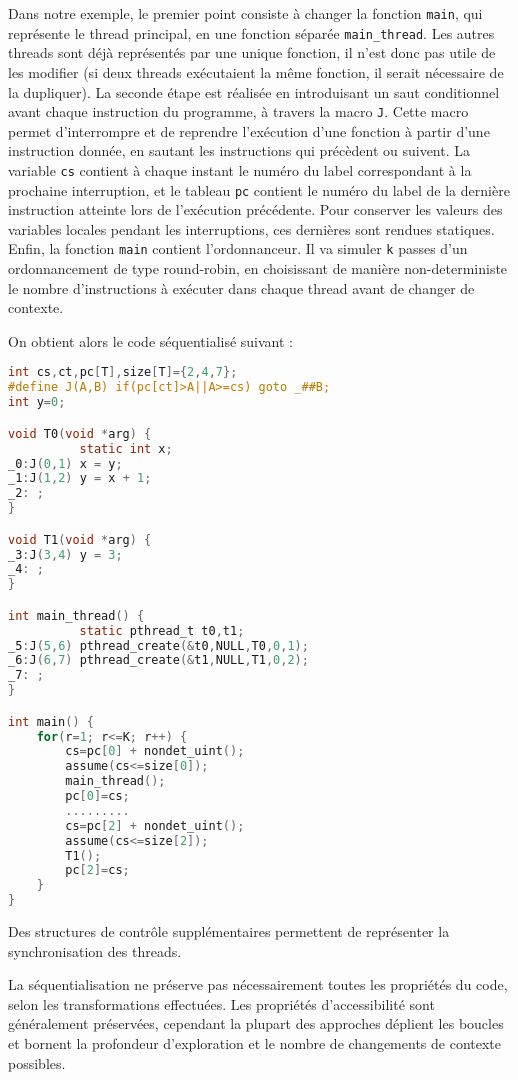 Dans notre exemple, le premier point consiste à changer la fonction
\lstinline!main!, qui représente le thread principal, en une fonction
séparée \lstinline!main_thread!. Les autres threads sont déjà
représentés par une unique fonction, il n'est donc pas utile de les
modifier (si deux threads exécutaient la même fonction, il serait
nécessaire de la dupliquer). La seconde étape est réalisée en
introduisant un saut conditionnel avant chaque instruction du programme,
à travers la macro \lstinline!J!. Cette macro permet d'interrompre et de
reprendre l'exécution d'une fonction à partir d'une instruction donnée,
en sautant les instructions qui précèdent ou suivent. La variable
\lstinline!cs! contient à chaque instant le numéro du label
correspondant à la prochaine interruption, et le tableau \lstinline!pc!
contient le numéro du label de la dernière instruction atteinte lors de
l'exécution précédente. Pour conserver les valeurs des variables locales
pendant les interruptions, ces dernières sont rendues statiques. Enfin,
la fonction \lstinline!main! contient l'ordonnanceur. Il va simuler
\lstinline!k! passes d'un ordonnancement de type round-robin, en
choisissant de manière non-deterministe le nombre d'instructions à
exécuter dans chaque thread avant de changer de contexte.

On obtient alors le code séquentialisé suivant :

\begin{lstlisting}[language=C]
int cs,ct,pc[T],size[T]={2,4,7};
#define J(A,B) if(pc[ct]>A||A>=cs) goto _##B;
int y=0;

void T0(void *arg) {
          static int x;
_0:J(0,1) x = y;
_1:J(1,2) y = x + 1;
_2: ;
}

void T1(void *arg) {
_3:J(3,4) y = 3;
_4: ;
}

int main_thread() {
          static pthread_t t0,t1;
_5:J(5,6) pthread_create(&t0,NULL,T0,0,1);
_6:J(6,7) pthread_create(&t1,NULL,T1,0,2);
_7: ;
}

int main() {
    for(r=1; r<=K; r++) {
        cs=pc[0] + nondet_uint();
        assume(cs<=size[0]);
        main_thread();
        pc[0]=cs;
        .........
        cs=pc[2] + nondet_uint();
        assume(cs<=size[2]);
        T1();
        pc[2]=cs;
    }
}
\end{lstlisting}

Des structures de contrôle supplémentaires permettent de représenter la
synchronisation des threads.

La séquentialisation ne préserve pas nécessairement toutes les
propriétés du code, selon les transformations effectuées. Les propriétés
d'accessibilité sont généralement préservées, cependant la plupart des
approches déplient les boucles et bornent la profondeur d'exploration et
le nombre de changements de contexte possibles.

